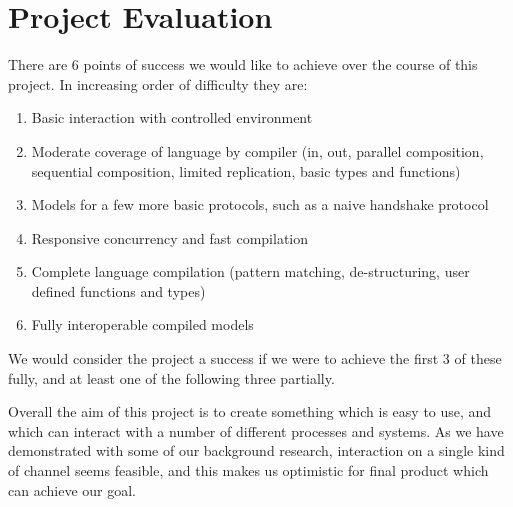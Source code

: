 \section{Project Evaluation}

There are 6 points of success we would like to achieve over the course of this project. In increasing order of difficulty they are:
\begin{enumerate}
    \item Basic interaction with controlled environment
    \item Moderate coverage of language by compiler (in, out, parallel composition, sequential composition, limited replication, basic types and functions) 
    \item Models for a few more basic protocols, such as a naive handshake protocol
    \item Responsive concurrency and fast compilation
    \item Complete language compilation (pattern matching, de-structuring, user defined functions and types)
    \item Fully interoperable compiled models
\end{enumerate}

We would consider the project a success if we were to achieve the first 3 of these fully, and at least one of the following three partially.

Overall the aim of this project is to create something which is easy to use, and which can interact with a number of different processes and systems. As we have demonstrated with some of our background research, interaction on a single kind of channel seems feasible, and this makes us optimistic for final product which can achieve our goal. 


